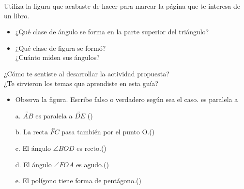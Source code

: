 \documentclass[10pt,twoside]{article}
\begin{document}
\begin{minipage}{.35\textwidth}
\end{minipage}
\begin{minipage}{.6\textwidth}
Utiliza la figura que acabaste de hacer para marcar la
página que te interesa de un libro.
\begin{itemize}
\item ¿Qué clase de ángulo se forma en la parte superior del triángulo? 
\item ¿Qué clase de figura se formó?\\
¿Cuánto miden sus ángulos?
\end{itemize}
\end{minipage}

\begin{minipage}{.6\textwidth}
¿Cómo te sentiste al desarrollar la actividad propuesta?\\
¿Te sirvieron los temas que aprendiste en esta guía?
\begin{itemize}
\item Observa la figura. Escribe falso o verdadero según sea el caso.
es paralela a
\end{itemize}
\begin{enumerate}
\item[a.] $\overleftrightarrow{AB}$ es paralela a $\overleftrightarrow{DE}$ (\quad)
\item[b.] La recta $ \overleftrightarrow{FC}$ pasa también por el punto O.(\quad)	
\item[c.] El ángulo $\angle BOD$ es recto.(\quad )
\item[d.] El ángulo $\angle FOA$ es agudo.(\quad )
\item[e.] El polígono tiene forma de pentágono.(\quad)	
\end{enumerate}
\end{minipage}
\begin{minipage}{.35\textwidth}
\end{minipage}
\end{document}
